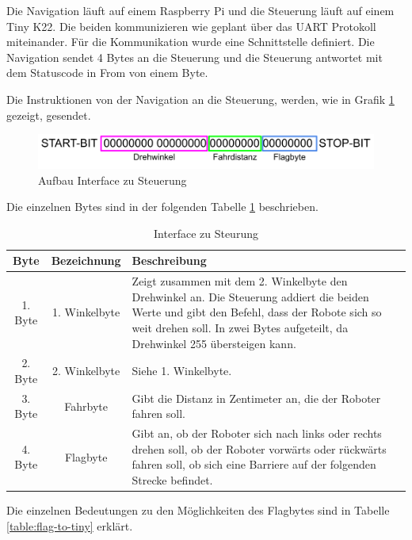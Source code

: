 Die Navigation läuft auf einem Raspberry Pi und die Steuerung läuft auf einem Tiny K22. Die beiden kommunizieren wie geplant über das UART Protokoll miteinander. Für die Kommunikation wurde eine Schnittstelle definiert. Die Navigation sendet 4 Bytes an die Steuerung und die Steuerung antwortet mit dem Statuscode in From von einem Byte.

Die Instruktionen von der Navigation an die Steuerung, werden, wie in Grafik \ref{fig:interface-tiny} gezeigt, gesendet.

\begin{figure}[H]
\centering
\includegraphics[width=\textwidth]{assets/IT/interface-tiny.png}
\caption{Aufbau Interface zu Steuerung}
\label{fig:interface-tiny}
\end{figure}

Die einzelnen Bytes sind in der folgenden Tabelle \ref{table:interface-to-tiny} beschrieben.

\begin{table}[H]
\centering
\small
\begin{tabularx}{\textwidth}{|c|c|X|}
\hline
  \textbf{Byte} &\textbf{Bezeichnung} & \textbf{Beschreibung}\\
  \hline
      1. Byte&1. Winkelbyte &Zeigt zusammen mit dem 2. Winkelbyte den Drehwinkel an. Die Steuerung addiert die beiden Werte und gibt den Befehl, dass der Robote sich so weit drehen soll. In zwei Bytes aufgeteilt, da Drehwinkel 255 übersteigen kann.\\
  \hline
2. Byte&2. Winkelbyte&Siehe 1. Winkelbyte.\\
  \hline
  3. Byte&Fahrbyte&Gibt die Distanz in Zentimeter an, die der Roboter fahren soll.\\
  \hline
  4. Byte&Flagbyte&Gibt an, ob der Roboter sich nach links oder rechts drehen soll, ob der Roboter vorwärts oder rückwärts fahren soll, ob sich eine Barriere auf der folgenden Strecke befindet.\\
  \hline
  \end{tabularx}
\caption{Interface zu Steurung}
\label{table:interface-to-tiny}
\end{table}

Die einzelnen Bedeutungen zu den Möglichkeiten des Flagbytes sind in Tabelle \ref{table:flag-to-tiny} erklärt.

